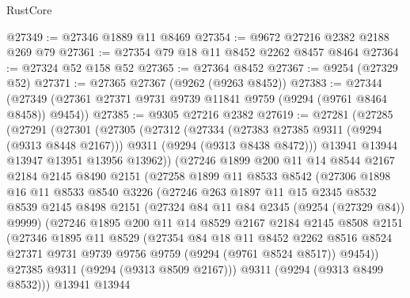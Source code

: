 \begin{lexlean}{RustCore}
\begin{coremodule}
@27349 := @27346 @1889 @11 @8469
@27354 := @9672 @27216 @2382 @2188 @269 @79
@27361 := @27354 @79 @18 @11 @8452 @2262 @8457 @8464
@27364 := @27324 @52 @158 @52
@27365 := @27364 @8452
@27367 := @9254 (@27329 @52)
@27371 := @27365 @27367 (@9262 (@9263 @8452))
@27383 := @27344 (@27349 (@27361 @27371 @9731 @9739 @11841 @9759 (@9294 (@9761 @8464 @8458)) @9454))
@27385 := @9305 @27216 @2382
@27619 := @27281
    (@27285
      (@27291
        (@27301
          (@27305
            (@27312
              (@27334
                (@27383 @27385 @9311 (@9294 (@9313 @8448 @2167)))
                @9311
                (@9294 (@9313 @8438 @8472)))
              @13941
              @13944
              @13947
              @13951
              @13956
              @13962))
          (@27246
            @1899
            @200
            @11
            @14
            @8544
            @2167
            @2184
            @2145
            @8490
            @2151
            (@27258
              @1899
              @11
              @8533
              @8542
              (@27306
                @1898
                @16
                @11
                @8533
                @8540
                @3226
                (@27246
                  @263
                  @1897
                  @11
                  @15
                  @2345
                  @8532
                  @8539
                  @2145
                  @8498
                  @2151
                  (@27324 @84 @11 @84 @2345 (@9254 (@27329 @84)) @9999)
                  (@27246
                    @1895
                    @200
                    @11
                    @14
                    @8529
                    @2167
                    @2184
                    @2145
                    @8508
                    @2151
                    (@27346
                      @1895
                      @11
                      @8529
                      (@27354
                        @84
                        @18
                        @11
                        @8452
                        @2262
                        @8516
                        @8524
                        @27371
                        @9731
                        @9739
                        @9756
                        @9759
                        (@9294 (@9761 @8524 @8517))
                        @9454))
                    @27385
                    @9311
                    (@9294 (@9313 @8509 @2167)))
                  @9311
                  (@9294 (@9313 @8499 @8532)))
                @13941
                @13944

\end{coremodule}
\end{lexlean}
